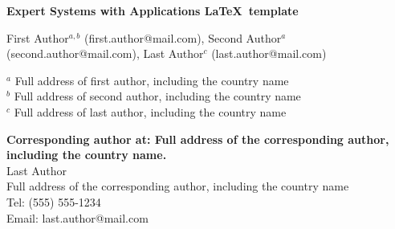 \documentclass[review]{elsarticle}
\begin{document}
\begin{frontmatter}


\begin{titlepage}
\begin{center}
\vspace*{1cm}

\textbf{ \large Expert Systems with Applications \LaTeX\ template}

\vspace{1.5cm}

First Author$^{a,b}$ (first.author@mail.com), Second Author$^a$ (second.author@mail.com), Last Author$^c$ (last.author@mail.com) \\

\hspace{10pt}

\begin{flushleft}
\small
$^a$ Full address of first author, including the country name \\
$^b$ Full address of second author, including the country name \\
$^c$ Full address of last author, including the country name

\vspace{1cm}
\textbf{Corresponding author at: Full address of the corresponding author, including the country name.} \\
Last Author \\
Full address of the corresponding author, including the country name \\
Tel: (555) 555-1234 \\
Email: last.author@mail.com

\end{flushleft}
\end{center}
\end{titlepage}


\end{frontmatter}
\end{document}
